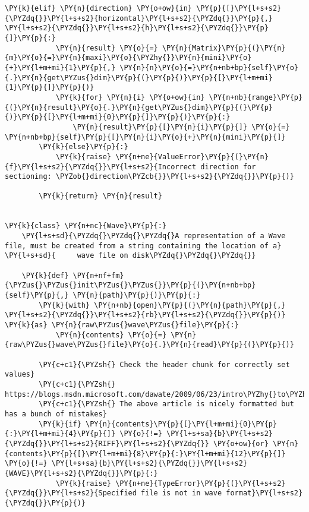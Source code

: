 \begin{Verbatim}[commandchars=\\\{\}]
        \PY{k}{elif} \PY{n}{direction} \PY{o+ow}{in} \PY{p}{[}\PY{l+s+s2}{\PYZdq{}}\PY{l+s+s2}{horizontal}\PY{l+s+s2}{\PYZdq{}}\PY{p}{,} \PY{l+s+s2}{\PYZdq{}}\PY{l+s+s2}{h}\PY{l+s+s2}{\PYZdq{}}\PY{p}{]}\PY{p}{:}
            \PY{n}{result} \PY{o}{=} \PY{n}{Matrix}\PY{p}{(}\PY{n}{m}\PY{o}{=}\PY{n}{maxi}\PY{o}{\PYZhy{}}\PY{n}{mini}\PY{o}{+}\PY{l+m+mi}{1}\PY{p}{,} \PY{n}{n}\PY{o}{=}\PY{n+nb+bp}{self}\PY{o}{.}\PY{n}{get\PYZus{}dim}\PY{p}{(}\PY{p}{)}\PY{p}{[}\PY{l+m+mi}{1}\PY{p}{]}\PY{p}{)}
            \PY{k}{for} \PY{n}{i} \PY{o+ow}{in} \PY{n+nb}{range}\PY{p}{(}\PY{n}{result}\PY{o}{.}\PY{n}{get\PYZus{}dim}\PY{p}{(}\PY{p}{)}\PY{p}{[}\PY{l+m+mi}{0}\PY{p}{]}\PY{p}{)}\PY{p}{:}
                \PY{n}{result}\PY{p}{[}\PY{n}{i}\PY{p}{]} \PY{o}{=} \PY{n+nb+bp}{self}\PY{p}{[}\PY{n}{i}\PY{o}{+}\PY{n}{mini}\PY{p}{]}
        \PY{k}{else}\PY{p}{:}
            \PY{k}{raise} \PY{n+ne}{ValueError}\PY{p}{(}\PY{n}{f}\PY{l+s+s2}{\PYZdq{}}\PY{l+s+s2}{Incorrect direction for sectioning: \PYZob{}direction\PYZcb{}}\PY{l+s+s2}{\PYZdq{}}\PY{p}{)}
        
        \PY{k}{return} \PY{n}{result}


\PY{k}{class} \PY{n+nc}{Wave}\PY{p}{:}
    \PY{l+s+sd}{\PYZdq{}\PYZdq{}\PYZdq{}A representation of a Wave file, must be created from a string containing the location of a}
\PY{l+s+sd}{     wave file on disk\PYZdq{}\PYZdq{}\PYZdq{}}

    \PY{k}{def} \PY{n+nf+fm}{\PYZus{}\PYZus{}init\PYZus{}\PYZus{}}\PY{p}{(}\PY{n+nb+bp}{self}\PY{p}{,} \PY{n}{path}\PY{p}{)}\PY{p}{:}
        \PY{k}{with} \PY{n+nb}{open}\PY{p}{(}\PY{n}{path}\PY{p}{,} \PY{l+s+s2}{\PYZdq{}}\PY{l+s+s2}{rb}\PY{l+s+s2}{\PYZdq{}}\PY{p}{)} \PY{k}{as} \PY{n}{raw\PYZus{}wave\PYZus{}file}\PY{p}{:}
            \PY{n}{contents} \PY{o}{=} \PY{n}{raw\PYZus{}wave\PYZus{}file}\PY{o}{.}\PY{n}{read}\PY{p}{(}\PY{p}{)}

        \PY{c+c1}{\PYZsh{} Check the header chunk for correctly set values}
        \PY{c+c1}{\PYZsh{} https://blogs.msdn.microsoft.com/dawate/2009/06/23/intro\PYZhy{}to\PYZhy{}audio\PYZhy{}programming\PYZhy{}part\PYZhy{}2\PYZhy{}demystifying\PYZhy{}the\PYZhy{}wav\PYZhy{}format/}
        \PY{c+c1}{\PYZsh{} The above article is nicely formatted but has a bunch of mistakes}
        \PY{k}{if} \PY{n}{contents}\PY{p}{[}\PY{l+m+mi}{0}\PY{p}{:}\PY{l+m+mi}{4}\PY{p}{]} \PY{o}{!=} \PY{l+s+sa}{b}\PY{l+s+s2}{\PYZdq{}}\PY{l+s+s2}{RIFF}\PY{l+s+s2}{\PYZdq{}} \PY{o+ow}{or} \PY{n}{contents}\PY{p}{[}\PY{l+m+mi}{8}\PY{p}{:}\PY{l+m+mi}{12}\PY{p}{]} \PY{o}{!=} \PY{l+s+sa}{b}\PY{l+s+s2}{\PYZdq{}}\PY{l+s+s2}{WAVE}\PY{l+s+s2}{\PYZdq{}}\PY{p}{:}
            \PY{k}{raise} \PY{n+ne}{TypeError}\PY{p}{(}\PY{l+s+s2}{\PYZdq{}}\PY{l+s+s2}{Specified file is not in wave format}\PY{l+s+s2}{\PYZdq{}}\PY{p}{)}


\end{Verbatim}
